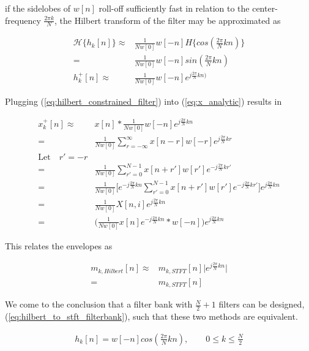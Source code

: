 \documentclass [11pt, proquest,oneside] {ganter_thesis}[2015/03/03]
\begin{document}
if the sidelobes of $w[n]$ roll-off sufficiently fast in relation to the center-frequency $\frac{2\pi k}{N}$, the Hilbert transform of the filter may be approximated as

\begin{align}
\mathcal{H}\{h_k[n]\} \approx& \frac{1}{Nw[0]}w[-n] H\{cos(\frac{2\pi}{N}kn)\} \nonumber \\
=& \frac{1}{Nw[0]}w[-n]sin(\frac{2\pi}{N}kn) \\
\label{eq:hilbert_constrained_filter}
h^+_k[n] \approx& \frac{1}{Nw[0]}w[-n]e^{j\frac{2\pi}{N}kn)}
\end{align}

Plugging (\ref{eq:hilbert_constrained_filter}) into (\ref{eq:x_analytic}) results in

\begin{align}
x^+_k[n] \approx& x[n] * \frac{1}{Nw[0]}w[-n]e^{j\frac{2\pi}{N}kn} \nonumber \\
=& \frac{1}{Nw[0]}\sum\limits_{r=-\infty}^{\infty}x[n - r] w[-r] e^{j\frac{2\pi}{N}kr} \nonumber \\
\textrm{Let} \quad r' = -r \nonumber \\
=& \frac{1}{Nw[0]}\sum\limits_{r'=0}^{N-1} x[n + r'] w[r'] e^{-j\frac{2\pi}{N}kr'} \nonumber \\
=& \frac{1}{Nw[0]}\bigg[e^{-j\frac{2\pi}{N}kn} \sum\limits_{r'=0}^{N-1} x[n + r'] w[r'] e^{-j\frac{2\pi}{N}kr'}\bigg]e^{j\frac{2\pi}{N}kn} \nonumber \\
=& \frac{1}{Nw[0]}X[n,i]e^{j\frac{2\pi}{N}kn} \nonumber \\
=& \Bigg( \frac{1}{Nw[0]}  x[n] e^{-j\frac{2\pi}{N}kn} * w[-n] \Bigg) e^{j\frac{2\pi}{N}kn}
\end{align}

This relates the envelopes as 

\begin{align}
m_{k,Hilbert}[n] \approx& m_{k,STFT}[n] \Big| e^{j\frac{2\pi}{N}kn} \Big| \nonumber \\
=& m_{k,STFT}[n]
\end{align}

We come to the conclusion that a filter bank with $\frac{N}{2} + 1$ filters can be designed, (\ref{eq:hilbert_to_stft_filterbank}), such that these two methods are equivalent.

\begin{align}
\label{eq:hilbert_to_stft_filterbank}
h_k[n] = w[-n]cos(\frac{2\pi}{N}kn), \qquad 0 \leq k \leq \frac{N}{2}
\end{align}
\end{document}
